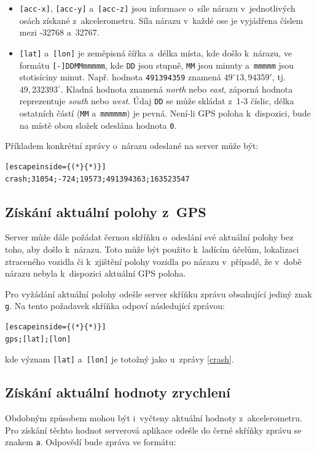 \documentclass[a4paper,11pt,titlepage]{article}
\begin{document}
\begin{itemize}
\item \texttt{[acc-x]}, \texttt{[acc-y]} a~\texttt{[acc-z]} jsou informace o~síle nárazu v~jednotlivých osách
získané z~akcelerometru. Síla nárazu v~každé ose je vyjádřena číslem mezi -32768
a~32767.
\item \texttt{[lat]} a~\texttt{[lon]} je zeměpisná šířka a~délka místa, kde došlo k~nárazu, ve formátu
\texttt{[-]DDMMmmmmm}, kde \texttt{DD} jsou stupně, \texttt{MM} jsou minuty a~\texttt{mmmmm} jsou stotisíciny minut.
Např. hodnota \texttt{491394359} znamená $49^\circ13,94359'$, tj. $49,232393^\circ$. Kladná hodnota znamená \textit{north} nebo \textit{east}, záporná hodnota reprezentuje
\textit{south} nebo \textit{west}. Údaj \texttt{DD} se může skládat z~1-3 číslic, délka ostatních
částí (\texttt{MM} a~\texttt{mmmmmm}) je pevná. Není-li GPS poloha k~dispozici, bude
na místě obou složek odeslána hodnota \texttt{0}.
\end{itemize}

Příkladem konkrétní zprávy o~nárazu odeslané na server může být:

\begin{lstlisting}[escapeinside={(*}{*)}]
crash;31054;-724;19573;491394363;163523547
\end{lstlisting}

\subsection{Získání aktuální polohy z~GPS}
\label{gps}
Server může dále požádat černou skříňku o~odeslání své aktuální polohy bez toho,
aby došlo k~nárazu. Toto může být použito k~ladícím účelům, lokalizaci ztraceného
vozidla či k~zjištění polohy vozidla po nárazu v~případě, že v~době nárazu nebyla k~dispozici
aktuální GPS poloha.

Pro vyžádání aktuální polohy odešle server skříňku zprávu obsahující jediný znak \texttt{g}.
Na tento požadavek skříňka odpoví následující zprávou:

\begin{lstlisting}[escapeinside={(*}{*)}]
gps;[lat];[lon]
\end{lstlisting}

kde význam \texttt{[lat]} a~\texttt{[lon]} je totožný jako u~zprávy \ref{crash}.

\subsection{Získání aktuální hodnoty zrychlení}
\label{acc}
Obdobným způsobem mohou být i~vyčteny aktuální hodnoty z~akcelerometru. Pro získání
těchto hodnot serverová aplikace odešle do černé skříňky zprávu se znakem \texttt{a}.
Odpovědí bude zpráva ve formátu:
\end{document}

